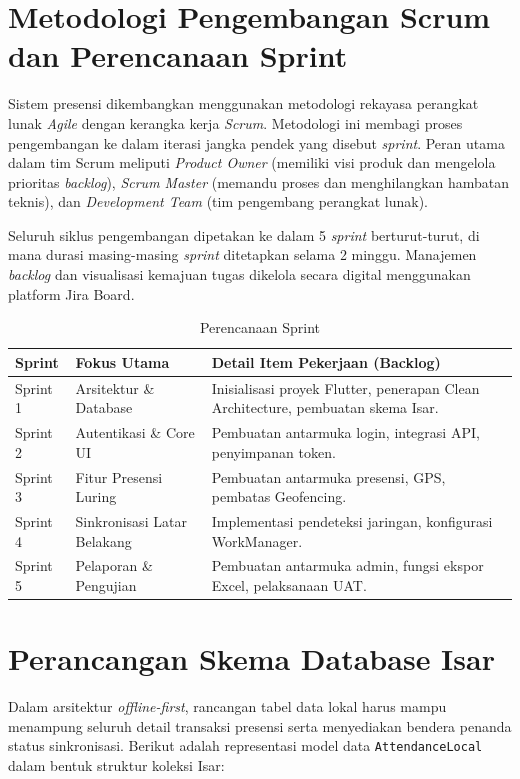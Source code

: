 \section{Metodologi Pengembangan Scrum dan Perencanaan Sprint}
Sistem presensi dikembangkan menggunakan metodologi rekayasa perangkat lunak \textit{Agile} dengan kerangka kerja \textit{Scrum}. Metodologi ini membagi proses pengembangan ke dalam iterasi jangka pendek yang disebut \textit{sprint}. Peran utama dalam tim Scrum meliputi \textit{Product Owner} (memiliki visi produk dan mengelola prioritas \textit{backlog}), \textit{Scrum Master} (memandu proses dan menghilangkan hambatan teknis), dan \textit{Development Team} (tim pengembang perangkat lunak).

Seluruh siklus pengembangan dipetakan ke dalam 5 \textit{sprint} berturut-turut, di mana durasi masing-masing \textit{sprint} ditetapkan selama 2 minggu. Manajemen \textit{backlog} dan visualisasi kemajuan tugas dikelola secara digital menggunakan platform Jira Board.

\begin{table}[ht]
\centering
\caption{Perencanaan Sprint}
\label{tab:perencanaan_sprint}
\begin{tabular}{|l|p{3.5cm}|p{6cm}|}
\hline
\textbf{Sprint} & \textbf{Fokus Utama} & \textbf{Detail Item Pekerjaan (Backlog)} \\ \hline
Sprint 1 & Arsitektur \& Database & Inisialisasi proyek Flutter, penerapan Clean Architecture, pembuatan skema Isar. \\ \hline
Sprint 2 & Autentikasi \& Core UI & Pembuatan antarmuka login, integrasi API, penyimpanan token. \\ \hline
Sprint 3 & Fitur Presensi Luring & Pembuatan antarmuka presensi, GPS, pembatas Geofencing. \\ \hline
Sprint 4 & Sinkronisasi Latar Belakang & Implementasi pendeteksi jaringan, konfigurasi WorkManager. \\ \hline
Sprint 5 & Pelaporan \& Pengujian & Pembuatan antarmuka admin, fungsi ekspor Excel, pelaksanaan UAT. \\ \hline
\end{tabular}
\end{table}

\section{Perancangan Skema Database Isar}
Dalam arsitektur \textit{offline-first}, rancangan tabel data lokal harus mampu menampung seluruh detail transaksi presensi serta menyediakan bendera penanda status sinkronisasi. Berikut adalah representasi model data \texttt{AttendanceLocal} dalam bentuk struktur koleksi Isar:

